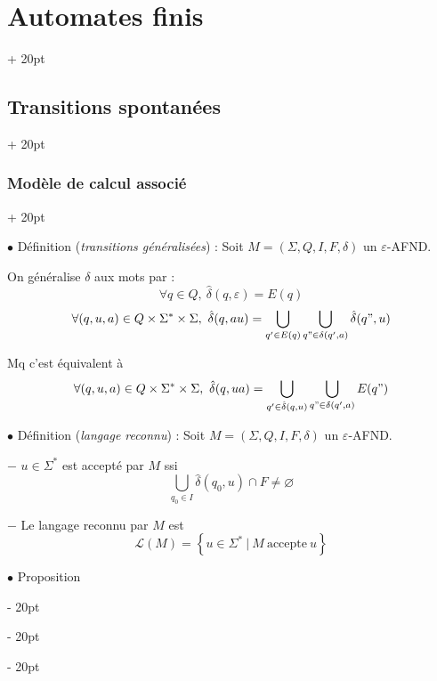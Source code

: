 \documentclass[a4paper, 12pt, twoside]{article}
\newcommand{\nset}[2]{\left\llbracket #1\ ;\ #2 \right\rrbracket}
\newcommand{\set}[1]{\left\{ #1 \right\}}
\newcommand{\ssi}{\ \Leftrightarrow \ }
\newcommand{\ind}[1][20pt]{\advance\leftskip + #1}
\newcommand{\deind}[1][20pt]{\advance\leftskip - #1}
\newenvironment{indt}[2][20pt]{#2 \par \ind[#1]}{\par \deind} %
\begin{document}
\begin{indt}{\section{Automates finis}}
\begin{indt}{\subsection{Transitions spontanées}}
\begin{indt}{\subsubsection{Modèle de calcul associé}}
                \vspace{12pt}
                
                $\bullet$ Définition (\textit{transitions généralisées}) : Soit $M = (\Sigma, Q, I, F, \delta)$ un $\varepsilon$-AFND.

                On généralise $\delta$ aux mots par :
                \[
                    \forall q \in Q,\ \hat \delta(q, \varepsilon) = E(q)
                \]
                \[
                    \forall (q, u, a) \in Q \times \Sigma^* \times \Sigma,\
                    \hat \delta(q, au)
                    = \bigcup_{q' \in E(q)} \bigcup_{q" \in \delta(q', a)} \hat \delta(q", u)
                \]

                 Mq c'est équivalent à
                \[
                    \forall (q, u, a) \in Q \times \Sigma^* \times \Sigma,\
                    \hat \delta(q, ua)
                    = \bigcup_{q' \in \hat \delta(q, u)} \bigcup_{q" \in \delta(q', a)} E(q")
                \]

                \vspace{12pt}
                
                $\bullet$ Définition (\textit{langage reconnu}) : Soit $M = (\Sigma, Q, I, F, \delta)$ un $\varepsilon$-AFND.

                $-$ $u \in \Sigma^*$ est accepté par $M$ ssi
                \[
                    \bigcup_{q_0 \in I} \hat \delta(q_0, u) \cap F \neq \varnothing
                \]

                $-$ Le langage reconnu par $M$ est
                \[
                    \mathcal L(M) = \set{u \in \Sigma^*\ |\ M\ \text{accepte}\ u}
                \]

                \vspace{12pt}
                
                $\bullet$ Proposition


                

\end{indt}
\end{indt}
\end{indt}
\end{document}
